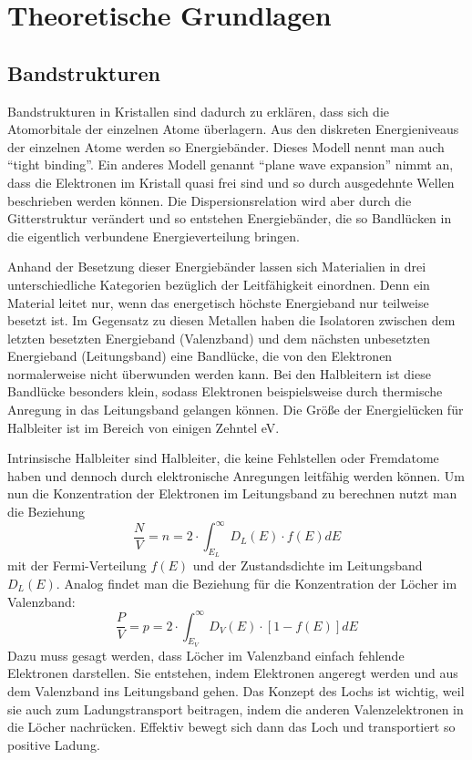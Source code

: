 \section{Theoretische Grundlagen}
\subsection{Bandstrukturen}
Bandstrukturen in Kristallen sind dadurch zu erklären, dass sich die Atomorbitale der einzelnen Atome überlagern. Aus den diskreten Energieniveaus der einzelnen Atome werden so Energiebänder. Dieses Modell nennt man auch ``tight binding''. Ein anderes Modell genannt ``plane wave expansion'' nimmt an, dass die Elektronen im Kristall quasi frei sind und so durch ausgedehnte Wellen beschrieben werden können. Die Dispersionsrelation wird aber durch die Gitterstruktur verändert und so entstehen Energiebänder, die so Bandlücken in die eigentlich verbundene Energieverteilung bringen.

Anhand der Besetzung dieser Energiebänder lassen sich Materialien in drei unterschiedliche Kategorien bezüglich der Leitfähigkeit einordnen. Denn ein Material leitet nur, wenn das energetisch höchste Energieband nur teilweise besetzt ist. Im Gegensatz zu diesen Metallen haben die Isolatoren zwischen dem letzten besetzten Energieband (Valenzband) und dem nächsten unbesetzten Energieband (Leitungsband) eine Bandlücke, die von den Elektronen normalerweise nicht überwunden werden kann. Bei den Halbleitern ist diese Bandlücke besonders klein, sodass Elektronen beispielsweise durch thermische Anregung in das Leitungsband gelangen können. Die Größe der Energielücken für Halbleiter ist im Bereich von einigen Zehntel eV.

Intrinsische Halbleiter sind Halbleiter, die keine Fehlstellen oder Fremdatome haben und dennoch durch elektronische Anregungen leitfähig werden können. Um nun die Konzentration der Elektronen im Leitungsband zu berechnen nutzt man die Beziehung
\begin{equation}
\frac{N}{V}=n = 2\cdot \int_{E_L}^\infty D_L(E)\cdot f(E)dE
\end{equation}
mit der Fermi-Verteilung $f(E)$ und der Zustandsdichte im Leitungsband $D_L(E)$.
Analog findet man die Beziehung für die Konzentration der Löcher im Valenzband:
\begin{equation}
 \frac{P}{V}=p = 2\cdot \int_{E_V}^\infty D_V(E)\cdot [1-f(E)]dE
\end{equation}
Dazu muss gesagt werden, dass Löcher im Valenzband einfach fehlende Elektronen darstellen. Sie entstehen, indem Elektronen angeregt werden und aus dem Valenzband ins Leitungsband gehen. Das Konzept des Lochs ist wichtig, weil sie auch zum Ladungstransport beitragen, indem die anderen Valenzelektronen in die Löcher nachrücken. Effektiv bewegt sich dann das Loch und transportiert so positive Ladung.

